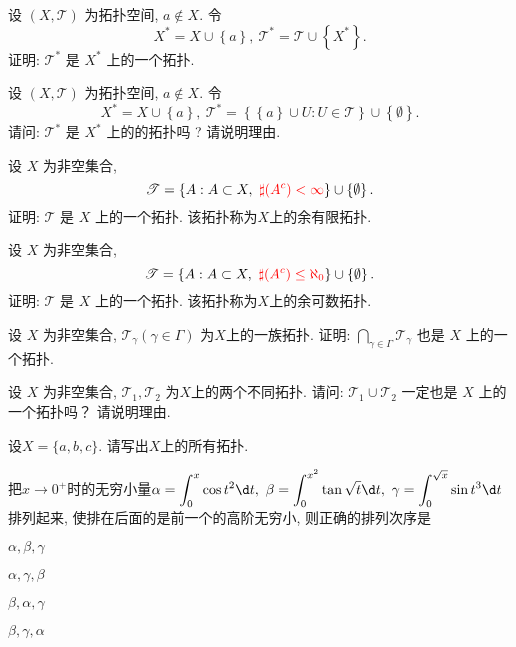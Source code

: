 \begin{exercise}
 设  $(X, \mathscr{T})$ 为拓扑空间, $a\notin X$. 令
  \[X^{\ast}=X\cup \left\{a\right\},\ \mathscr{T}^{\ast}=\mathscr{T}\cup \left\{X^{\ast}\right\}.\]
  证明: $\mathscr{T}^{\ast}$ 是 $X^{\ast}$ 上的一个拓扑.
\end{exercise}
  
\begin{exercise}	
 设  $(X, \mathscr{T})$ 为拓扑空间, $a\notin X$. 令
  \[X^{\ast}=X\cup \left\{a\right\},\ \mathscr{T}^{\ast}=\left\{\left\{a\right\}\cup U: U\in\mathscr{T}\right\}\cup \left\{\emptyset\right\}.\]
  请问: $\mathscr{T}^{\ast}$ 是 $X^{\ast}$ 上的的拓扑吗 ? 请说明理由.
\end{exercise}
  
\begin{exercise}	
 设 $X$ 为非空集合,
  \[\mathscr{T}=\left\{A: A\subset X,\  {\color{red}\sharp
    (A^c)<\infty}\right\}\cup \left\{\emptyset\right\}.\]
  证明: $\mathscr{T}$ 是 $X$ 上的一个拓扑. 该拓扑称为$X$上的{\color{red}余有限拓扑}.
\end{exercise}
  
\begin{exercise}	
设 $X$ 为非空集合,
  \[\mathscr{T}=\left\{A: A\subset X,\  {\color{red}\sharp
    (A^c)\leq \aleph_0}\right\}\cup \left\{\emptyset\right\}.\]
  证明: $\mathscr{T}$ 是 $X$ 上的一个拓扑. 该拓扑称为$X$上的{\color{red}余可数拓扑}.

\end{exercise}

\begin{exercise} 设  $X$ 为非空集合, $\mathscr{T}_{\gamma}(\gamma\in\Gamma)$ 为$X$上的一族拓扑.  证明: $\displaystyle \bigcap_{\gamma\in\Gamma}\mathscr{T}_{\gamma}$ 也是 $X$ 上的一个拓扑.
\end{exercise}

\begin{exercise}	
 设  $X$ 为非空集合, $\mathscr{T}_1, \mathscr{T}_2$ 为$X$上的两个不同拓扑. 请问: $\mathscr{T}_1\cup\mathscr{T}_2$ 一定也是 $X$ 上的一个拓扑吗？ 请说明理由.
\end{exercise}
  
\begin{exercise}	
 设$X=\{a,b,c\}$. 请写出$X$上的所有拓扑.
\end{exercise}

\begin{exercise}
  把$x\to0^{+}$时的无穷小量$\displaystyle\alpha=\int_0^x\cos t^2 \d t, \ \beta=\int_0^{x^2}\tan\sqrt{t} \d t,\ \gamma=\int_0^{\sqrt{x}}\sin t^3 \d t$ 排列起来, 使排在后面的是前一个的高阶无穷小, 则正确的排列次序是 \paren
  \begin{choices}
    \item $\alpha, \beta, \gamma$
    \item $\alpha, \gamma, \beta$
    \item $\beta, \alpha, \gamma$
    \item $\beta, \gamma, \alpha$
  \end{choices}
\end{exercise}

